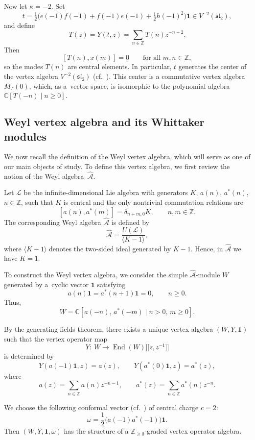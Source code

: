 \documentclass[10pt,a4paper]{amsart}
\numberwithin{equation}{section}
\theoremstyle{definition}
\newcommand{\1}{\textbf{1}}
\begin{document}
Now let $\kappa = -2$.
Set
\[
 t = \tfrac{1}{2}\bigl( e(-1)f(-1) + f(-1)e(-1) + \tfrac{1}{2}h(-1)^2 \bigr)\mathbf{1}
 \in V^{-2}(\mathfrak{sl}_2),
\]
and define
\[
 T(z) = Y(t,z) = \sum_{n \in \mathbb{Z}} T(n) z^{-n-2}.
\]
Then
\[
 [T(n), x(m)] = 0 \qquad \text{for all } m,n \in \mathbb{Z},
\]
so the modes $T(n)$ are central elements.
In particular, $t$ generates the center of the vertex algebra $V^{-2}(\mathfrak{sl}_2)$
(cf.~\cite{efren,FB}).
This center is a commutative vertex algebra $M_T(0)$, which, as a~vector space, is isomorphic to the polynomial algebra
$ \mathbb{C}[ T(-n) \mid n \ge 0 ]$.

\subsection{Weyl vertex algebra and its Whittaker modules}
\label{Weyl}

We now recall the definition of the Weyl vertex algebra, which will serve as one of our main objects of study.
To define this vertex algebra, we first review the notion of the Weyl algebra~$\widehat{\mathcal{A}}$.

Let $\mathcal{L}$ be the infinite-dimensional Lie algebra with generators
$K$, $a(n)$, $a^{*}(n)$, $n \in \mathbb{Z}$,
such that $K$ is central and the only nontrivial commutation relations are
\[
 [a(n), a^{*}(m)] = \delta_{n+m,0} K, \qquad n,m \in \mathbb{Z}.
\]
The corresponding Weyl algebra $\widehat{\mathcal{A}}$ is defined by{\samepage
\[
 \widehat{\mathcal{A}} = \frac{U(\mathcal{L})}{\langle K - 1 \rangle},
\]
where $\langle K - 1 \rangle$ denotes the two-sided ideal generated by $K - 1$.
Hence, in $\widehat{\mathcal{A}}$ we have $K = 1$.}

To construct the Weyl vertex algebra, we consider the simple $\widehat{\mathcal{A}}$-module $W$ generated by a~cyclic vector $\mathbf{1}$ satisfying
\[
 a(n)\mathbf{1} = a^{*}(n+1)\mathbf{1} = 0, \qquad n \ge 0.
\]
Thus,
\[
 W= \mathbb{C}[ a(-n),\, a^{*}(-m) \mid n > 0,\, m \ge 0 ].
\]


By the generating fields theorem, there exists a unique vertex algebra $(W, Y, \mathbf{1})$
such that the vertex operator map
\[
 Y\colon \ W\longrightarrow \operatorname{End}(W)\bigl[\bigl[z, z^{-1}\bigr]\bigr]
\]
is determined by
\[
 Y(a(-1)\mathbf{1}, z) = a(z), \qquad Y(a^{*}(0)\mathbf{1}, z) = a^{*}(z),
\]
where
\[
 a(z) = \sum_{n \in \mathbb{Z}} a(n) z^{-n-1},
 \qquad
 a^{*}(z) = \sum_{n \in \mathbb{Z}} a^{*}(n) z^{-n}.
\]

We choose the following conformal vector (cf.~\cite{KR}) of central charge $c = 2$:
\[
 \omega = \frac{1}{2}\bigl(a(-1)a^{*}(-1) \bigr)\mathbf{1}.
\]
Then $(W, Y, \mathbf{1}, \omega)$ has the structure of a
$ \mathbb{Z}_{\ge 0}$-graded vertex operator algebra.
\end{document}
